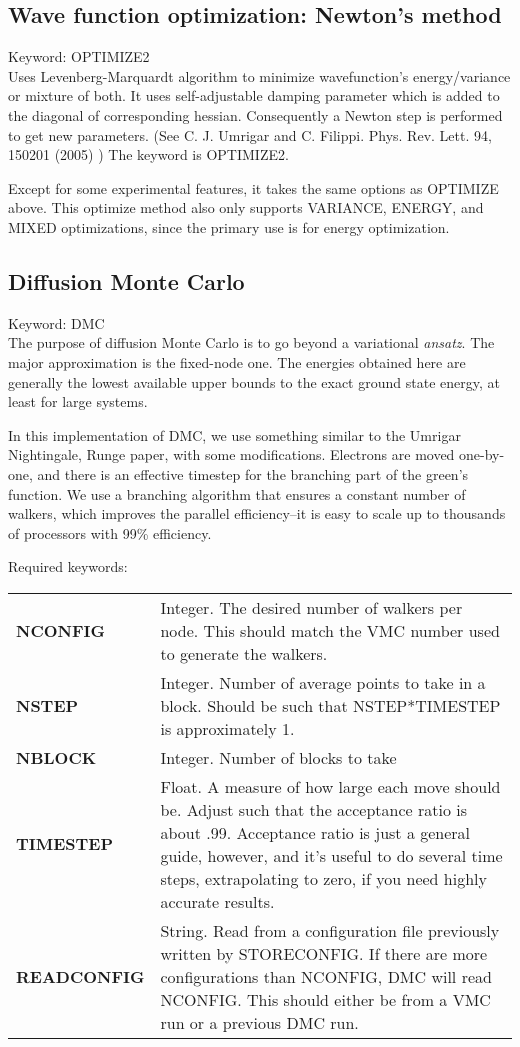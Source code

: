 \documentclass[12pt]{article}
\begin{document}
\newpage
\subsection{Wave function optimization: Newton's method}
Keyword: OPTIMIZE2 \\

Uses Levenberg-Marquardt algorithm to minimize wavefunction's
energy/variance or mixture of both. It uses self-adjustable 
damping parameter which is added to the diagonal of corresponding hessian.
Consequently a Newton step is performed to get new parameters.    
(See C. J. Umrigar and C. Filippi.  Phys. Rev. Lett. 94, 150201 (2005) )
The keyword is OPTIMIZE2.

Except for some experimental features, it takes the same options as OPTIMIZE 
above.  This optimize method also only supports VARIANCE, ENERGY, and 
MIXED optimizations, since the primary use is for energy optimization.

\newpage
\subsection{Diffusion Monte Carlo}
Keyword: DMC \\

The purpose of diffusion Monte Carlo is to go beyond a variational 
\emph{ansatz}.  The major approximation is the fixed-node one.  
The energies obtained here are generally the lowest 
available upper bounds to the exact ground state energy, at least for 
large systems.  

In this implementation of DMC, we use something similar to the Umrigar
Nightingale, Runge paper, with some modifications.  Electrons are moved 
one-by-one, and there is an effective timestep for the branching part of 
the green's function.  We use a branching algorithm 
that ensures a constant number of walkers, which improves the 
parallel efficiency--it is easy to scale up to thousands of processors
with 99\% efficiency.

Required keywords: \\
\begin{tabular}{lp{12cm}}
{\bf NCONFIG} &  Integer. The desired number of walkers
per node.  This should match the VMC number used to generate the walkers. \\
{\bf NSTEP} & Integer.   Number of average points to take in a block.
 Should be such that NSTEP*TIMESTEP is approximately 1. \\
{\bf NBLOCK} & Integer.  Number of blocks to take\\
{\bf TIMESTEP} & Float.  A measure of how large each move 
should be.  Adjust such that the acceptance ratio is about .99. Acceptance ratio
is just a general guide, however, and it's useful to do several time steps, extrapolating
to zero, if you need highly accurate results.\\
{\bf  READCONFIG } & String.  Read from a configuration file
previously written by STORECONFIG.  If there are more  configurations 
than NCONFIG, DMC will read NCONFIG.  This should either be from a VMC 
run or a previous DMC run. \\
\end{tabular}
\end{document}
